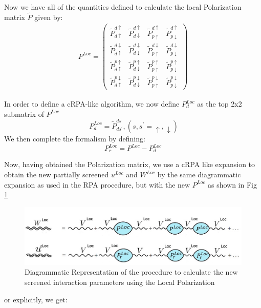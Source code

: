 \documentclass[10pt]{ruthesis}
\begin{document}
{Now we have all of the quantities defined to calculate the local Polarization matrix $\tilde{P}$ given by:
\begin{eqnarray}
 P^{Loc}=
\left(
\begin{array}{cccc}
\tilde P^{d\uparrow}_{d\uparrow}&\tilde P^{d\uparrow}_{d\downarrow}&\tilde P^{d\uparrow}_{p\uparrow}&\tilde P^{d\uparrow}_{p\downarrow}\\
\tilde P^{d\downarrow}_{d\uparrow}&\tilde P^{d\downarrow}_{d\downarrow}&\tilde P^{d\downarrow}_{p\uparrow}&\tilde P^{d\downarrow}_{p\downarrow}\\
\tilde P^{p\uparrow}_{d\uparrow}&\tilde P^{p\uparrow}_{d\downarrow}&\tilde P^{p\uparrow}_{p\uparrow}&\tilde P^{p\uparrow}_{p\downarrow}\\
\tilde P^{p\downarrow}_{d\uparrow}&\tilde P^{p\downarrow}_{d\downarrow}&\tilde P^{p\downarrow}_{p\uparrow}&\tilde P^{p\downarrow}_{p\downarrow}
\end{array}
\right)
\end{eqnarray}

 In order to define a cRPA-like algorithm, we now define  $P^{Loc}_d$ as the top 2x2 submatrix of $P^{Loc}$ 
\begin{equation}
 \ P^{Loc}_d= \tilde P^{ds}_{ds^\prime},(s,s^\prime={\uparrow,\downarrow})
 \end{equation}
 We then complete the formalism by defining:
 \begin{equation}
P^{Loc}_r= P^{Loc}- P^{Loc}_d
 \end{equation}
 
 Now, having obtained the Polarization matrix, we use a cRPA like expansion to obtain the new partially screened $u^{Loc}$ and $W^{Loc}$ by the same diagrammatic expansion as used in the RPA procedure, but with the new $P^{Loc}$ as shown in Fig \ref{W_loc_fig}
 
\begin{figure}[H]
\begin{center}
\includegraphics[width=0.85\columnwidth]{W_loc_rpa.jpg}
\caption{Diagrammatic Representation of the procedure to calculate the new screened interaction parameters using the Local Polarization \label{W_loc_fig}}
\end{center}
\end{figure} 
or explicitly, we get: 

}
\end{document}
